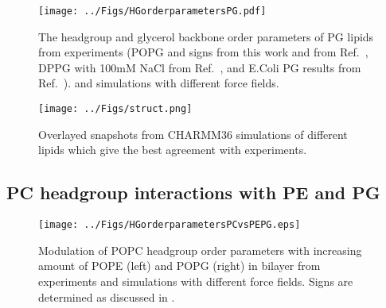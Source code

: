 \documentclass[aps,prl,superscriptaddress,twocolumn]{revtex4}
\begin{document}
\begin{figure}[!h]
  \centering
  \texttt{[image: ../Figs/HGorderparametersPG.pdf]}
  \caption{\label{HGorderParametersPOPG}
    The headgroup and glycerol backbone order parameters of PG lipids
    from experiments (POPG and signs from this work and from Ref.~, %
    DPPG with 100mM NaCl from Ref.~,%
    and E.Coli PG results from Ref.~).
    and simulations with different force fields.
  }
\end{figure}
\begin{figure*}[!h]
  \centering
  \texttt{[image: ../Figs/struct.png]}
  \caption{\label{structures}
    Overlayed snapshots from CHARMM36 simulations of different lipids which give the best agreement with experiments.
  }
\end{figure*}

\clearpage
\subsection{PC headgroup interactions with PE and PG}
\begin{figure*}[]
  \centering
  \texttt{[image: ../Figs/HGorderparametersPCvsPEPG.eps]}
  \caption{\label{HGorderparametersPCvsPEPG}
    Modulation of POPC headgroup order parameters with increasing amount of POPE (left) and POPG (right) in bilayer
    from experiments \cite{scherer87,macdonald87} and simulations with different force fields.
    Signs are determined as discussed in \cite{botan15,ollila16}.
  }
\end{figure*}
\end{document}
